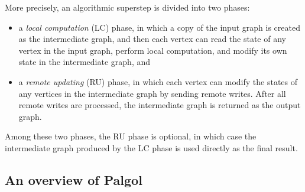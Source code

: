\documentclass{sokendai_thesis} %
\begin{document}
More precisely, an algorithmic superstep is divided into two phases:
\begin{itemize}
 \item a \emph{local computation} (LC) phase, in which a copy of the input graph is created as the intermediate graph, and then each vertex can read the state of any vertex in the input graph, perform local computation, and modify its own state in the intermediate graph, and
 \item a \emph{remote updating} (RU) phase, in which each vertex can modify the states of any vertices in the intermediate graph by sending remote writes.
After all remote writes are processed, the intermediate graph is returned as the output graph.
\end{itemize}
Among these two phases, the RU phase is optional, in which case the intermediate graph produced by the LC phase is used directly as the final result.

\subsection{An overview of Palgol}
\label{sec:palgol-syntax}
\end{document}
